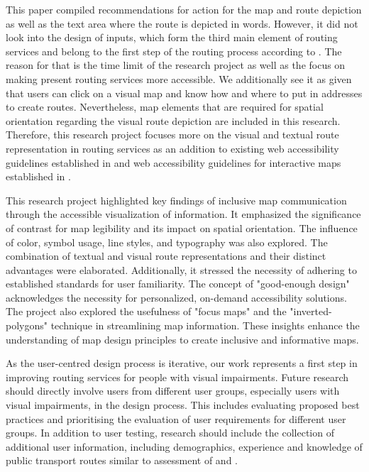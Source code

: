 \documentclass[agile, final]{copernicus-agile}
\begin{document}
This paper compiled recommendations for action for the map and route depiction as well as the text area where the route is depicted in words. However, it did not look into the design of inputs, which form the third main element of routing services and belong to the first step of the routing process according to \citet{Delikostidis2011}. The reason for that is the time limit of the research project as well as the focus on making present routing services more accessible. We additionally see it as given that users can click on a visual map and know how and where to put in addresses to create routes. Nevertheless, map elements that are required for spatial orientation regarding the visual route depiction are included in this research. Therefore, this research project focuses more on the visual and textual route representation in routing services as an addition to existing web accessibility guidelines established in \citet{W3C2023} and web accessibility guidelines for interactive maps established in \citet{W3C2012}. 



This research project highlighted key findings of inclusive map communication through the accessible visualization of information. It emphasized the significance of contrast for map legibility and its impact on spatial orientation. The influence of color, symbol usage, line styles, and typography was also explored. The combination of textual and visual route representations and their distinct advantages were elaborated. Additionally, it stressed the necessity of adhering to established standards for user familiarity. The concept of "good-enough design" acknowledges the necessity for personalized, on-demand accessibility solutions. The project also explored the usefulness of "focus maps" and the "inverted-polygons" technique in streamlining map information. These insights enhance the understanding of map design principles to create inclusive and informative maps.

As the user-centred design process is iterative, our work represents a first step in improving routing services for people with visual impairments. Future research should directly involve users from different user groups, especially users with visual impairments, in the design process. This includes evaluating proposed best practices and prioritising the evaluation of user requirements for different user groups. In addition to user testing, research should include the collection of additional user information, including demographics, experience and knowledge of public transport routes similar to assessment of \citet{EngelEA2022} and \citet{LoitschMuller2023}.
\end{document}
